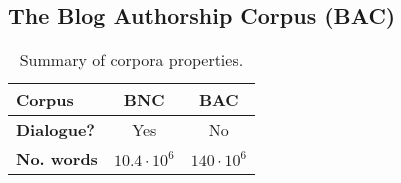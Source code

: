 \subsection{The Blog Authorship Corpus (BAC)}

\begin{table}[H]
    \centering
    \begin{tabular}{l | c  c}
        \hline
        \textbf{Corpus} & BNC & BAC \\
        \hline
        \textbf{Dialogue?} & Yes & No\\
        \textbf{No. words} & $10.4 \cdot 10^6$  & $140 \cdot 10^6$ \\
        
        \hline
    \end{tabular}
    \caption{Summary of corpora properties.}
    \label{tab:summary_corpora}
\end{table}
